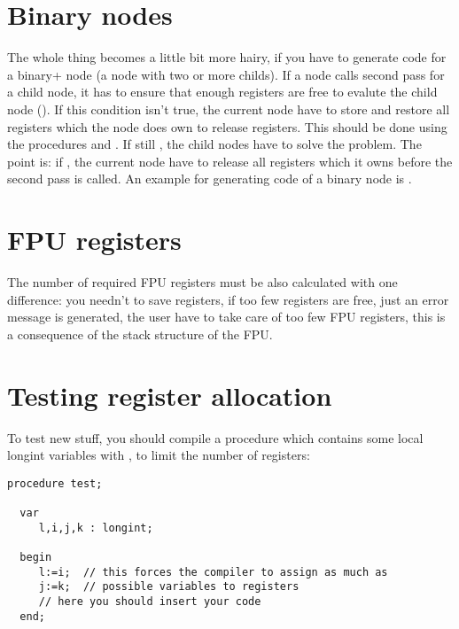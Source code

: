 \documentclass{report}
\begin{document}
\section{Binary nodes}

The whole thing becomes a little bit more hairy, if you have to
generate code for a binary+ node (a node with two or more
childs). If a node calls second pass for a child node,
it has to ensure that enough registers are free
to evalute the child node ().
If this condition isn't true, the current node have
to store and restore all registers which the node does own to
release registers. This should be done using the
procedures  and . If still
, the child nodes have to solve
the problem. The point is: if ,
the current node have to release all registers which it owns
before the second pass is called. An example for generating
code of a binary node is .

\section{FPU registers}

The number of required FPU registers must be also calculated with
one difference: you needn't to save registers, if too few registers
are free, just an error message is generated, the user
have to take care of too few FPU registers, this is a consequence
of the stack structure of the FPU.

\section{Testing register allocation}

To test new stuff, you should compile a procedure which contains some local
longint variables with , to limit the number of
registers:

\begin{verbatim}
procedure test;

  var
     l,i,j,k : longint;

  begin
     l:=i;  // this forces the compiler to assign as much as       
     j:=k;  // possible variables to registers
     // here you should insert your code
  end;
\end{verbatim}
\end{document}
